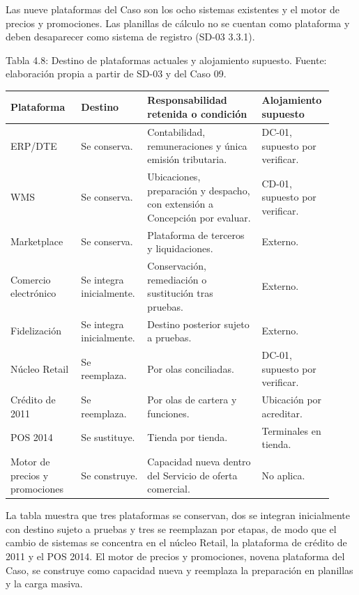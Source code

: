 \documentclass[11pt]{article}
\begin{document}
Las nueve plataformas del Caso son los ocho sistemas existentes y el motor de precios y promociones. Las planillas de cálculo no se cuentan como plataforma y deben desaparecer como sistema de registro (SD-03 3.3.1).

\par\vspace{0pt plus 10\baselineskip}\vspace{0pt plus -10\baselineskip}

Tabla 4.8: Destino de plataformas actuales y alojamiento supuesto. Fuente: elaboración propia a partir de SD-03 y del Caso 09.\par\nopagebreak
\begin{longtable}{@{}p{0.212\linewidth}p{0.192\linewidth}p{0.346\linewidth}p{0.173\linewidth}@{}}
\toprule Plataforma & Destino & Responsabilidad retenida o condición & Alojamiento supuesto \\
\midrule\endhead\bottomrule\endlastfoot
ERP/DTE & Se conserva. & Contabilidad, remuneraciones y única emisión tributaria. & DC-01, supuesto por verificar. \\
WMS & Se conserva. & Ubicaciones, preparación y despacho, con extensión a Concepción por evaluar. & CD-01, supuesto por verificar. \\
Marketplace & Se conserva. & Plataforma de terceros y liquidaciones. & Externo. \\
Comercio electrónico & Se integra inicialmente. & Conservación, remediación o sustitución tras pruebas. & Externo. \\
Fidelización & Se integra inicialmente. & Destino posterior sujeto a pruebas. & Externo. \\
Núcleo Retail & Se reemplaza. & Por olas conciliadas. & DC-01, supuesto por verificar. \\
Crédito de 2011 & Se reemplaza. & Por olas de cartera y funciones. & Ubicación por acreditar. \\
POS 2014 & Se sustituye. & Tienda por tienda. & Terminales en tienda. \\
Motor de precios y promociones & Se construye. & Capacidad nueva dentro del Servicio de oferta comercial. & No aplica. \\
\end{longtable}

La tabla muestra que tres plataformas se conservan, dos se integran inicialmente con destino sujeto a pruebas y tres se reemplazan por etapas, de modo que el cambio de sistemas se concentra en el núcleo Retail, la plataforma de crédito de 2011 y el POS 2014. El motor de precios y promociones, novena plataforma del Caso, se construye como capacidad nueva y reemplaza la preparación en planillas y la carga masiva.
\end{document}
